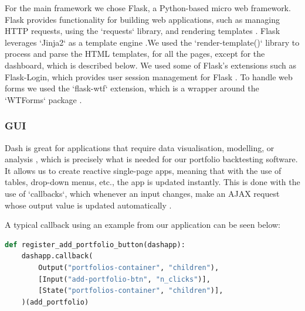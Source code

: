\documentclass[main.tex]{subfiles}
\begin{document}

For the main framework we chose Flask, a Python-based micro web framework. Flask provides functionality for building web applications, such as managing HTTP requests, using the `requests` library, and rendering templates \cite{smyth_2018}. Flask leverages `Jinja2` as a template engine \cite{templates_2010}.We used the `render-template()` library to process and parse the HTML templates, for all the pages, except for the dashboard, which is described below. We used some of Flask's extensions such as Flask-Login, which provides user session management for Flask \cite{flask-login}. To handle web forms we used the `flask-wtf` extension, which is a wrapper around the `WTForms` package \cite{wtforms-documentation}. 

\subsubsection{GUI}
\label{GUI}

Dash is great for applications that require data visualisation, modelling, or analysis \cite{dash}, which is precisely what is needed for our portfolio backtesting software. It allows us to create reactive single-page apps, meaning that with the use of tables, drop-down menus, etc., the app is updated instantly. This is done with the use of `callbacks`, which whenever an input changes, make an AJAX request whose output value is updated automatically \cite{callbacks}.

A typical callback using an example from our application can be seen below:

\begin{lstlisting}[language=Python, caption=setup.py - Development environment, label=lst:callback_example]
def register_add_portfolio_button(dashapp):
    dashapp.callback(
        Output("portfolios-container", "children"),
        [Input("add-portfolio-btn", "n_clicks")],
        [State("portfolios-container", "children")],
    )(add_portfolio)
\end{lstlisting}
\end{document}
